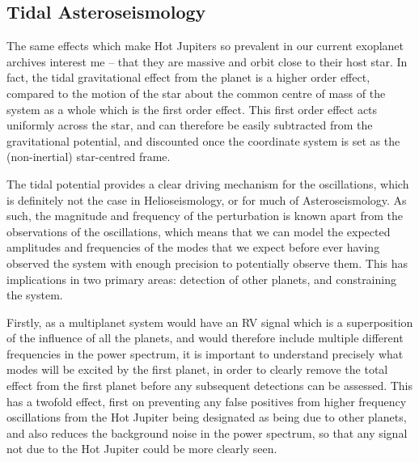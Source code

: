 \documentclass[11pt]{amsart}
\begin{document}
\subsection{Tidal Asteroseismology}

The same effects which make Hot Jupiters so prevalent in our current exoplanet archives interest me -- that they are massive and orbit close to their host star.  In fact, the tidal gravitational effect from the planet is a higher order effect, compared to the motion of the star about the common centre of mass of the system as a whole which is the first order effect.  This first order effect acts uniformly across the star, and can therefore be easily subtracted from the gravitational potential, and discounted once the coordinate system is set as the (non-inertial) star-centred frame.

The tidal potential provides a clear driving mechanism for the oscillations, which is definitely not the case in Helioseismology, or for much of Asteroseismology.  As such, the magnitude and frequency of the perturbation is known apart from the observations of the oscillations, which means that we can model the expected amplitudes and frequencies of the modes that we expect before ever having observed the system with enough precision to potentially observe them.  This has implications in two primary areas: detection of other planets, and constraining the system.

Firstly, as a multiplanet system would have an RV signal which is a superposition of the influence of all the planets, and would therefore include multiple different frequencies in the power spectrum, it is important to understand precisely what modes will be excited by the first planet, in order to clearly remove the total effect from the first planet before any subsequent detections can be assessed.  This has a twofold effect, first on preventing any false positives from higher frequency oscillations from the Hot Jupiter being designated as being due to other planets, and also reduces the background noise in the power spectrum, so that any signal not due to the Hot Jupiter could be more clearly seen.
\end{document}
